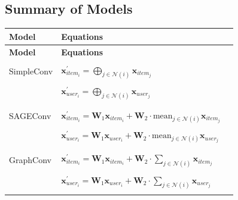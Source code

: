 \documentclass[bst/sn-nature]{sn-jnl}
\begin{document}
\begin{appendices}

\section{Summary of Models}\label{secA1}

\begin{longtable}{|l|l|l|}
    \hline
    \textbf{Model} & \textbf{Equations} \\
    \hline
    \endfirsthead
    
    \hline
    \textbf{Model} & \textbf{Equations} \\
    \hline
    \endhead
    
    \endfoot
    
    \hline
    \rowcolor[gray]{0.9} & \\
    \rowcolor[gray]{0.9} SimpleConv & $\mathbf{x}^{\prime}_{item_{i}} = \bigoplus_{j \in \mathcal{N}(i)} \mathbf{x}_{item_{j}}$ \\
    \rowcolor[gray]{0.9} & \\
    \rowcolor[gray]{0.9} & $\mathbf{x}^{\prime}_{user_{i}} = \bigoplus_{j \in \mathcal{N}(i)} \mathbf{x}_{user_{j}}$ \\
    \rowcolor[gray]{0.9} & \\

     & \\
    SAGEConv & $\mathbf{x}^{\prime}_{item_{i}} = \mathbf{W}_1 \mathbf{x}_{item_{i}} + \mathbf{W}_2 \cdot \mathrm{mean}_{j \in \mathcal{N}(i)} \mathbf{x}_{item_{j}}$ \\
     & \\
    & $\mathbf{x}^{\prime}_{user_{i}} = \mathbf{W}_1 \mathbf{x}_{user_{i}} + \mathbf{W}_2 \cdot \mathrm{mean}_{j \in \mathcal{N}(i)} \mathbf{x}_{user_{j}}$ \\
     & \\
    
    \rowcolor[gray]{0.9} & \\
    \rowcolor[gray]{0.9} GraphConv & $\mathbf{x}^{\prime}_{item_{i}} = \mathbf{W}_1 \mathbf{x}_{item_{i}} + \mathbf{W}_2 \cdot \sum_{j \in \mathcal{N}(i)} \mathbf{x}_{item_{j}}$ \\
    \rowcolor[gray]{0.9} & \\
    \rowcolor[gray]{0.9} & $\mathbf{x}^{\prime}_{user_{i}} = \mathbf{W}_1 \mathbf{x}_{user_{i}} + \mathbf{W}_2 \cdot \sum_{j \in \mathcal{N}(i)} \mathbf{x}_{user_{j}}$ \\
    \rowcolor[gray]{0.9} & \\


\end{longtable}
\end{appendices}
\end{document}
